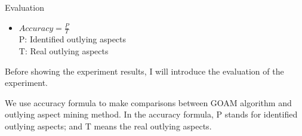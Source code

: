 \documentclass[
 size=14pt,
 paper=smartboard,  %
 mode=present, 		%
 display=slides, 	%
 style=tuliplab,  	%
 pauseslide,
 fleqn,leqno]{powerdot}
\begin{document}
\begin{slide}[toc=,bm=]{Evaluation}

\begin{center}
\begin{itemize}

\item
\smallskip
\large
{$Accuracy = \frac{P}{T}$ \\
P: Identified outlying aspects \\

T: Real outlying aspects}

\end{itemize}
\end{center}

\begin{note}
Before showing the experiment results,
I will introduce the evaluation of the experiment.

We use accuracy formula to make comparisons between GOAM algorithm
and outlying aspect mining method.
In the accuracy formula,
P stands for identified outlying aspects;
and T means the real outlying aspects.
\end{note}

\end{slide}
\end{document}
